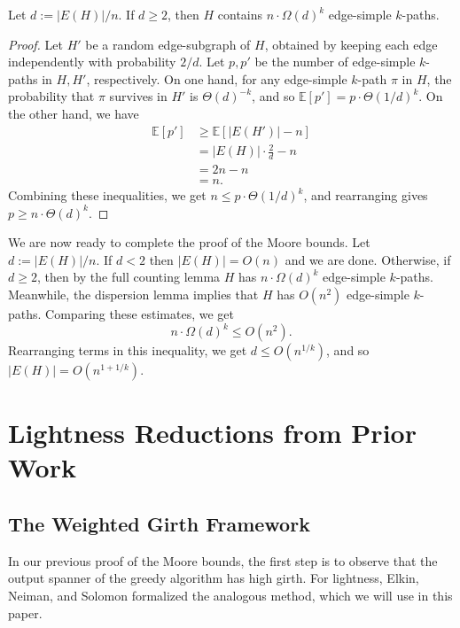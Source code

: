 \documentclass{article}\usepackage[a4paper,margin=20mm]{geometry}
\begin{document}
\begin{lemma}  \label{lem:moorefc}
Let $d := |E(H)|/n$.
If $d \ge 2$, then $H$ contains $n \cdot \Omega(d)^k$ edge-simple $k$-paths.
\end{lemma}
\begin{proof}
Let $H'$ be a random edge-subgraph of $H$, obtained by keeping each edge independently with probability $2/d$.
Let $p, p'$ be the number of edge-simple $k$-paths in $H, H'$, respectively.
On one hand, for any edge-simple $k$-path $\pi$ in $H$, the probability that $\pi$ survives in $H'$ is $\Theta(d)^{-k}$, and so
$\mathbb{E}[p'] = p \cdot \Theta(1/d)^{k}$.
On the other hand, we have
\begin{align*}
\mathbb{E}[p'] &\ge \mathbb{E}[|E(H')| - n] \tag*{Medium Counting Lemma}\\
&= |E(H)| \cdot \frac{2}{d} - n\\
&= 2n - n\\
&= n.
\end{align*}
Combining these inequalities, we get $n \le p \cdot \Theta(1/d)^{k}$, and rearranging gives $p \ge n \cdot \Theta(d)^k$.
\end{proof}

We are now ready to complete the proof of the Moore bounds.
Let $d := |E(H)|/n$.
If $d < 2$ then $|E(H)| = O(n)$ and we are done.
Otherwise, if $d \ge 2$, then by the full counting lemma $H$ has $n \cdot \Omega(d)^k$ edge-simple $k$-paths.
Meanwhile, the dispersion lemma implies that $H$ has $O(n^2)$ edge-simple $k$-paths.
Comparing these estimates, we get
$$n \cdot \Omega(d)^k \le O(n^2).$$
Rearranging terms in this inequality, we get
$d \le O(n^{1/k})$,
and so $|E(H)| = O(n^{1+1/k})$.


\section{Lightness Reductions from Prior Work \label{sec:priorwork}}

\subsection{The Weighted Girth Framework \label{sec:wtgirth}}

In our previous proof of the Moore bounds, the first step is to observe that the output spanner of the greedy algorithm has high girth.
For lightness, Elkin, Neiman, and Solomon \cite{ENS15} formalized the analogous method, which we will use in this paper.
\end{document}

